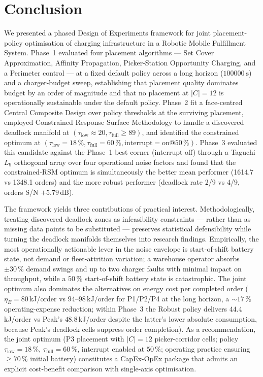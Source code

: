 \documentclass[conference]{IEEEtran}
\begin{document}
\section{Conclusion}
\label{sec:conclusion}
We presented a phased Design of Experiments framework for joint placement-policy optimisation of charging infrastructure in a Robotic Mobile Fulfillment System. Phase~1 evaluated four placement algorithms --- Set Cover Approximation, Affinity Propagation, Picker-Station Opportunity Charging, and a Perimeter control --- at a fixed default policy across a long horizon ($\SI{100000}{\second}$) and a charger-budget sweep, establishing that placement quality dominates budget by an order of magnitude and that no placement at $|C|=12$ is operationally sustainable under the default policy. Phase~2 fit a face-centred Central Composite Design over policy thresholds at the surviving placement, employed Constrained Response Surface Methodology to handle a discovered deadlock manifold at $(\tau_\text{low}\approx 20, \tau_\text{full}\ge 89)$, and identified the constrained optimum at $(\tau_\text{low}=18\,\%, \tau_\text{full}=60\,\%, \text{interrupt}=\text{on}@50\,\%)$. Phase~3 evaluated this candidate against the Phase~1 best corner (interrupt off) through a Taguchi $L_9$ orthogonal array over four operational noise factors and found that the constrained-RSM optimum is simultaneously the better mean performer (1614.7 vs 1348.1 orders) and the more robust performer (deadlock rate 2/9 vs 4/9, orders S/N $+5.79\,\text{dB}$).

The framework yields three contributions of practical interest. Methodologically, treating discovered deadlock zones as infeasibility constraints --- rather than as missing data points to be substituted --- preserves statistical defensibility while turning the deadlock manifolds themselves into research findings. Empirically, the most operationally actionable lever in the noise envelope is start-of-shift battery state, not demand or fleet-attrition variation; a warehouse operator absorbs $\pm 30\,\%$ demand swings and up to two charger faults with minimal impact on throughput, while a $50\,\%$ start-of-shift battery state is catastrophic. The joint optimum also dominates the alternatives on energy cost per completed order ($\eta_E = 80$\,kJ/order vs $94$--$98$\,kJ/order for P1/P2/P4 at the long horizon, a $\sim 17\,\%$ operating-expense reduction; within Phase~3 the Robust policy delivers $44.4$\,kJ/order vs Peak's $48.8$\,kJ/order despite the latter's lower absolute consumption, because Peak's deadlock cells suppress order completion). As a recommendation, the joint optimum (P3 placement with $|C|=12$ picker-corridor cells; policy $\tau_\text{low}=18\,\%$, $\tau_\text{full}=60\,\%$, interrupt enabled at $50\,\%$; operating practice ensuring $\ge 70\,\%$ initial battery) constitutes a CapEx-OpEx package that admits an explicit cost-benefit comparison with single-axis optimisation.
\end{document}

